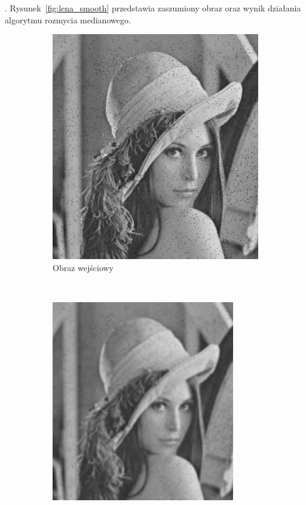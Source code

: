 . 
Rysunek~\ref{fig:lena_smooth} przedstawia zaszumiony obraz oraz wynik działania algorytmu rozmycia medianowego.
\begin{figure}
  \centering
  \begin{subfigure}[b]{0.45\textwidth}
    \includegraphics[width=\textwidth]{img/smooth-lena-input}
    \caption{Obraz wejściowy}
    \label{fig:smooth_lena_input}
  \end{subfigure}
  ~
  \begin{subfigure}[b]{0.45\textwidth}
    \includegraphics[width=\textwidth]{img/smooth-lena-gauss}

\end{subfigure}
\end{figure}
